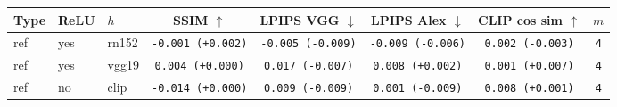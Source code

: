 \begin{tabular}{|l|l|l|c|c|c|c|c|}
\hline
Type & ReLU & $h$ & SSIM $\uparrow$ & LPIPS VGG $\downarrow$ & LPIPS Alex $\downarrow$ & CLIP cos sim $\uparrow$ & $m$ \\
\hline
ref & yes & rn152 & \texttt{-0.001 {\color{green}(+0.002)}} & \texttt{-0.005 {\color{green}(-0.009)}} & \texttt{-0.009 {\color{green}(-0.006)}} & \texttt{0.002 {\color{red}(-0.003)}} & \texttt{4} \\
\hline
ref & yes & vgg19 & \texttt{0.004 {\color{black}(+0.000)}} & \texttt{0.017 {\color{green}(-0.007)}} & \texttt{0.008 {\color{red}(+0.002)}} & \texttt{0.001 {\color{green}(+0.007)}} & \texttt{4} \\
\hline
ref & no & clip & \texttt{-0.014 {\color{black}(+0.000)}} & \texttt{0.009 {\color{green}(-0.009)}} & \texttt{0.001 {\color{green}(-0.009)}} & \texttt{0.008 {\color{green}(+0.001)}} & \texttt{4} \\
\hline
\end{tabular}
